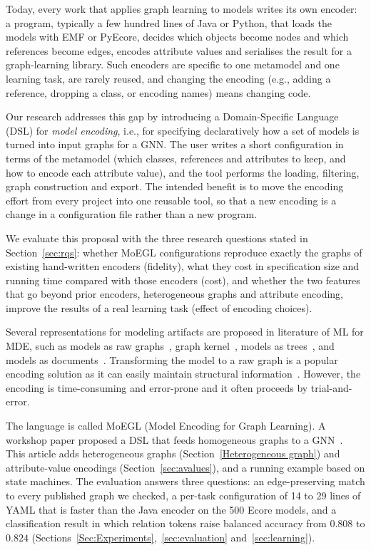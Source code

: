 \documentclass[journal,article,submit,moreauthors,technologies]{Definitions/mdpi}
\newcommand{\rev}[1]{#1}
\begin{document}
\rev{Today, every work that applies graph learning to models writes its own encoder: a program, typically a few hundred lines of Java or Python, that loads the models with EMF or PyEcore, decides which objects become nodes and which references become edges, encodes attribute values and serialises the result for a graph-learning library. Such encoders are specific to one metamodel and one learning task, are rarely reused, and changing the encoding (e.g., adding a reference, dropping a class, or encoding names) means changing code.}

\rev{Our research addresses this gap by introducing a Domain-Specific Language (DSL) for \emph{model encoding}, i.e., for specifying declaratively how a set of models is turned into input graphs for a GNN. The user writes a short configuration in terms of the metamodel (which classes, references and attributes to keep, and how to encode each attribute value), and the tool performs the loading, filtering, graph construction and export. The intended benefit is to move the encoding effort from every project into one reusable tool, so that a new encoding is a change in a configuration file rather than a new program.}

\rev{We evaluate this proposal with the three research questions stated in Section~\ref{sec:rqs}: whether MoEGL configurations reproduce exactly the graphs of existing hand-written encoders (fidelity), what they cost in specification size and running time compared with those encoders (cost), and whether the two features that go beyond prior encoders, heterogeneous graphs and attribute encoding, improve the results of a real learning task (effect of encoding choices).}

Several representations for modeling artifacts are proposed in literature of ML for MDE, such as models as raw graphs~\cite{lopez2022generating}, graph kernel~\cite{clariso2018applying}, models as trees~\cite{burgueno2019lstm}, and models as documents~\cite{nguyen2019automated, basciani2016automated}. Transforming the model to a raw graph is a popular encoding solution as it can easily maintain structural information~\cite{ali2023encoding}. However, the encoding is time-consuming and error-prone and it often proceeds by trial-and-error.

\rev{The language is called MoEGL (Model Encoding for Graph Learning). A workshop paper proposed a DSL that feeds homogeneous graphs to a GNN~\cite{rajaei2021dsl}. This article adds heterogeneous graphs (Section~\ref{Heterogeneous graph}) and attribute-value encodings (Section~\ref{sec:avalues}), and a running example based on state machines. The evaluation answers three questions: an edge-preserving match to every published graph we checked, a per-task configuration of 14 to 29 lines of YAML that is faster than the Java encoder on the 500 Ecore models, and a classification result in which relation tokens raise balanced accuracy from $0.808$ to $0.824$ (Sections~\ref{Sec:Experiments},~\ref{sec:evaluation} and~\ref{sec:learning}).}
\end{document}
